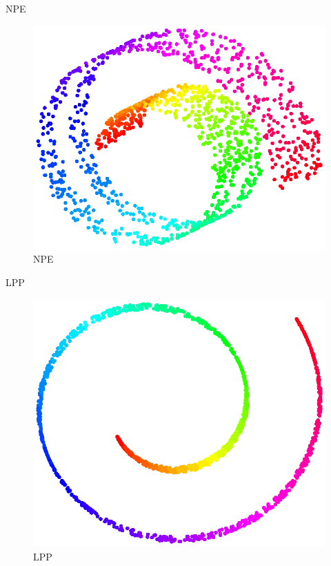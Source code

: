 \documentclass{beamer}
\begin{document}
\begin{darkframes}
   \begin{frame}{NPE}
   \begin{figure}
   \centering
   \includegraphics[scale=0.5]{./figs/lle1.eps}
   \caption{NPE}
   \end{figure}
   \end{frame}
   
   \begin{frame}{LPP}
   \begin{figure}
   \centering
   \includegraphics[scale=0.5]{./figs/le1.eps}
   \caption{LPP}
   \end{figure}
   \end{frame}
   

\end{darkframes}
\end{document}
